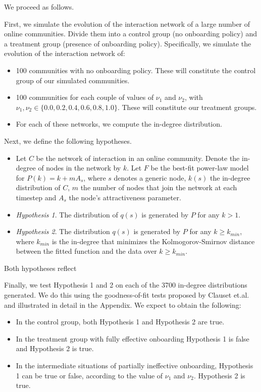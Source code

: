 \documentclass{nws}
\begin{document}
We proceed as follows.

First, we simulate the evolution of the interaction network of a large number of online communities. Divide them into a control group (no onboarding policy) and a treatment group (presence of onboarding policy). Specifically, we simulate the evolution of the interaction network of:

\begin{itemize}
\item 100 communities with no onboarding policy. These will constitute the control group of our simulated communities. 
\item 100 communities for each couple of values of $\nu_1$  and $\nu_2$, with $\nu_1, \nu_2 \in \{0.0, 0.2, 0.4, 0.6, 0.8, 1.0\}$. These will constitute our treatment groups.
\item For each of these networks, we compute the in-degree distribution.
\end{itemize}

Next, we define the following hypotheses. 


\begin{itemize}
\item Let $C$ be the network of interaction in an online community. Denote the in-degree of nodes in the network by $k$. Let $F$ be the best-fit power-law model for $P(k) = k + mA_s$, where $s$ denotes a generic node, $k(s)$ the in-degree distribution of $C$, $m$ the number of nodes that join the network at each timestep and $A_s$ the node's attractiveness parameter.
\item \emph{Hypothesis 1}. The distribution of $q(s)$ is generated by $P$ for any $k > 1$.
\item \emph{Hypothesis 2}. The distribution $q(s)$ is generated by $P$ for any $k \geq k_{min}$, where $k_{min}$ is the in-degree that minimizes the Kolmogorov-Smirnov distance between the fitted function and the data over $k \geq k_{min}$.
\end{itemize}

Both hypotheses reflect \cite{dorogovtsev2002evolution} 

Finally, we test Hypothesis 1 and 2 on each of the 3700 in-degree distributions generated. We do this using the goodness-of-fit tests proposed by Clauset et.al. \cite{clauset2009power} and illustrated in detail in the Appendix. We expect to obtain the following:

\begin{itemize}
\item In the control group, both Hypothesis 1 and Hypothesis 2 are true. 
\item In the treatment group with fully effective onboarding Hypothesis 1 is false and Hypothesis 2 is true. 
\item In the intermediate situations of partially ineffective onboarding, Hypothesis 1 can be true or false, according to the value of $\nu_1$ and $\nu_2$. Hypothesis 2 is true.
\end{itemize}
\end{document}
